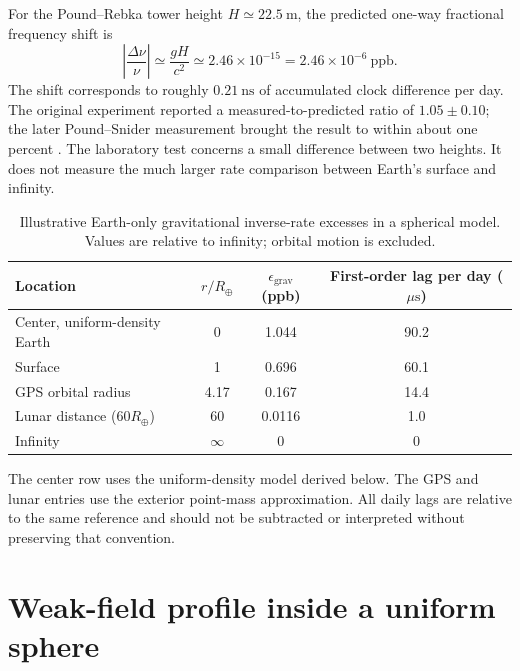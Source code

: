 \documentclass[12pt]{article}
\begin{document}
For the Pound--Rebka tower height $H\simeq22.5\ \mathrm{m}$, the predicted one-way fractional frequency shift is
\begin{equation}
  \left|\frac{\Delta\nu}{\nu}\right|
  \simeq\frac{gH}{c^2}
  \simeq2.46\times10^{-15}
  =2.46\times10^{-6}\ \mathrm{ppb}.
  \label{eq:tower-shift}
\end{equation}
The shift corresponds to roughly $0.21\ \mathrm{ns}$ of accumulated clock difference per day. The original experiment reported a measured-to-predicted ratio of $1.05\pm0.10$; the later Pound--Snider measurement brought the result to within about one percent \cite{PoundRebka,PoundSnider}. The laboratory test concerns a small difference between two heights. It does not measure the much larger rate comparison between Earth's surface and infinity.

\begin{table}[ht]
  \centering
  \caption{Illustrative Earth-only gravitational inverse-rate excesses in a spherical model. Values are relative to infinity; orbital motion is excluded.}
  \label{tab:earth-depths}
  \begin{tabular}{lccc}
    \toprule
    Location & $r/R_{\oplus}$ & $\epsilon_{\mathrm{grav}}$ (ppb) & First-order lag per day ($\mu\mathrm{s}$) \\
    \midrule
    Center, uniform-density Earth & 0 & 1.044 & 90.2 \\
    Surface & 1 & 0.696 & 60.1 \\
    GPS orbital radius & 4.17 & 0.167 & 14.4 \\
    Lunar distance ($60R_{\oplus}$) & 60 & 0.0116 & 1.0 \\
    Infinity & $\infty$ & 0 & 0 \\
    \bottomrule
  \end{tabular}
\end{table}
The center row uses the uniform-density model derived below. The GPS and lunar entries use the exterior point-mass approximation. All daily lags are relative to the same reference and should not be subtracted or interpreted without preserving that convention.

\section{Weak-field profile inside a uniform sphere}
\end{document}
